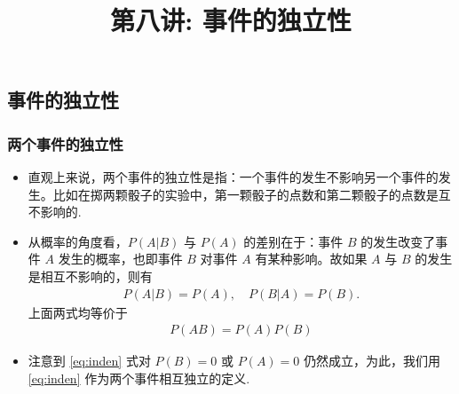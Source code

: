 

\title[概率论]{第八讲: 事件的独立性}
\date{}

{
	\begin{frame}
		\titlepage
	\end{frame}
}
\subsection{事件的独立性}

\begin{frame}
  \frametitle{两个事件的独立性}
  \begin{itemize}[<+-|alert@+>]
  \item 直观上来说，两个事件的独立性是指：一个事件的发生不影响另一个事件的发生。比如在掷两颗骰子的实验中，第一颗骰子的点数和第二颗骰子的点数是互不影响的.
  \item 从概率的角度看，$P (A|B)$ 与 $P (A)$ 的差别在于：事件 $B$ 的发生改变了事件 $A$ 发生的概率，也即事件 $B$ 对事件 $A$ 有某种影响。故如果 $A$ 与 $B$ 的发生是相互不影响的，则有 \pause
    \begin{eqnarray*}
      P(A|B)=P(A),\quad P(B|A)=P(B).
    \end{eqnarray*}
    \pause 上面两式均等价于
    \begin{eqnarray}\label{eq:inden}
      P(AB)=P(A)P(B)
    \end{eqnarray}
  \item 注意到 \eqref{eq:inden} 式对 $P (B)=0$ 或 $P (A)=0$ 仍然成立，为此，我们用 \eqref{eq:inden} 作为两个事件相互独立的定义.
  \end{itemize}
\end{frame}

